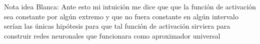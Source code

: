 \textcolor{dark_green}{Nota idea Blanca: Ante esto mi intuición me dice que que la función de activación sea constante por algún extremo y que no fuera constante en algún intervalo serían las únicas hipótesis para que tal función de activación sirviera para construir redes neuronales que funcionara como aproximador universal}


